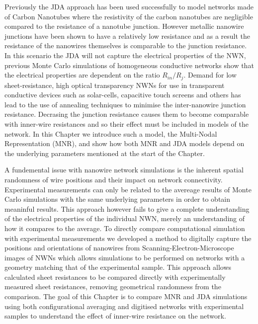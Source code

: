Previously the JDA approach has been used successfully to model networks made of Carbon Nanotubes \cite{nirmalraj2009,hecht2006} where the resistivity of the carbon nanotubes are negligible compared to the resistance of a nanotube junction.  However metallic nanowire junctions have been shown to have a relatively low resistance\cite{bellew2015} and as a result the resistance of the nanowires themselves is comparable to the junction resistance. In this scenario the JDA will not capture the electrical properties of the NWN, previous Monte Carlo simulations of homogeneous conductive networks show that the electrical properties are dependent on the ratio $R_{in}/R_{j}$\cite{li2009,hicks2009,zezelj2012}. Demand for low sheet-resistance, high optical transparency NWNs for use in transparent conductive devices such as solar-cells, capacitive touch screens and others\cite{madaria2010, sakunta2009,sukanta2011} has lead to the use of annealing techniques to minimise the inter-nanowire junction resistance. Decrasing the junction resistance causes them to become comparable with inner-wire resistances and so their effect must be included in models of the network. In this Chapter we introduce such a model, the Multi-Nodal Representation (MNR), and show how both MNR and JDA models depend on the underlying parameters mentioned at the start of the Chapter.

A fundemental issue with nanowire network simulations is the inherent spatial randomness of wire positions and their impact on network connectivity. Experimental measurements can only be related to the avereage results of Monte Carlo simulations with the same underlying parameters in order to obtain meaninful results\cite{mutiso2013}. This approach however fails to give a complete understanding of the electrical properties of the individual NWN, merely an understanding of how it compares to the average. To directly compare computational simulation with experimental measurements we developed a method to digitally capture the positions and orientations of nanowires from Scanning-Electron-Microscope images of NWNs which allows simulations to be performed on networks with a geometry matching that of the experimental sample. This approach allows calculated sheet resistances to be compared directly with experimentally measured sheet resistances, removing geometrical randomness from the comparison. The goal of this Chapter is to compare MNR and JDA simulations using both configurational averaging and digitised networks with experimental samples to understand the effect of inner-wire resistance on the network.

